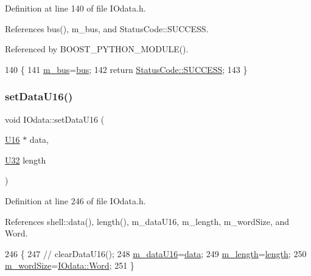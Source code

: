 Definition at line 140 of file I\+Odata.\+h.



References bus(), m\+\_\+bus, and Status\+Code\+::\+S\+U\+C\+C\+E\+SS.



Referenced by B\+O\+O\+S\+T\+\_\+\+P\+Y\+T\+H\+O\+N\+\_\+\+M\+O\+D\+U\+L\+E().


\begin{DoxyCode}
140                                   \{
141     \hyperlink{classIOdata_a42c07a9b3f43ec35dd18d13a67d294cc}{m\_bus}=\hyperlink{classIOdata_ab904bcca0e8e3bebc3299e47ca93a8a1}{bus};
142     \textcolor{keywordflow}{return} \hyperlink{classStatusCode_a6f565cbeadc76d14c72f047e5e85eb4badd0da38d3ba0d922efd1f4619bc37ad8}{StatusCode::SUCCESS};
143   \}
\end{DoxyCode}
\mbox{\label{classIOdata_a1796a65cbd8c4326e80d662034ee5e39}} 
\subsubsection{\texorpdfstring{set\+Data\+U16()}{setDataU16()}}
{\footnotesize\ttfamily void I\+Odata\+::set\+Data\+U16 (\begin{DoxyParamCaption}\item[{\hyperlink{classIOdata_a1eb45b348534a7c19a4a99b746e693ff}{U16} $\ast$}]{data,  }\item[{\hyperlink{classIOdata_a96fb57f5fcd87b708743abd3c86a5198}{U32}}]{length }\end{DoxyParamCaption})\hspace{0.3cm}{\ttfamily [inline]}}



Definition at line 246 of file I\+Odata.\+h.



References shell\+::data(), length(), m\+\_\+data\+U16, m\+\_\+length, m\+\_\+word\+Size, and Word.


\begin{DoxyCode}
246                                         \{
247 \textcolor{comment}{//    clearDataU16();}
248     \hyperlink{classIOdata_a8d698e077b7898009691b9086a3e6453}{m\_dataU16}=\hyperlink{namespaceshell_a5ea2525995cedc3efd69ea8a7f034d1e}{data};
249     \hyperlink{classIOdata_afabe57441da019eb614d277799106aac}{m\_length}=\hyperlink{classIOdata_abb40e71ce0290832a24857b4a1e7b1a3}{length};
250     \hyperlink{classIOdata_a719b0ce607ada4fa91b12d6ecfa1b4c9}{m\_wordSize}=\hyperlink{classIOdata_a37c53ebf4bf8d866aac8af572962a84ca7d603e9c9a55e3c8dffa4bd8e3dca491}{IOdata::Word};
251   \}
\end{DoxyCode}
\mbox{\label{classIOdata_a408b62ac645630c645ae670691f6459f}} 
